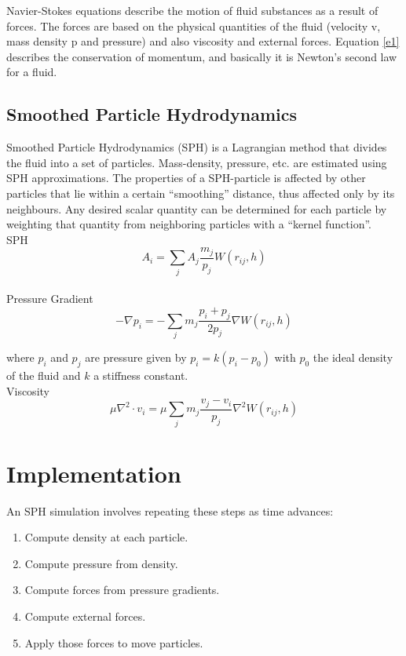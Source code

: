 \documentclass[a4paper,12pt,twoside]{report}
\begin{document}
\noindent Navier-Stokes equations describe the motion of fluid substances as a result of forces. The forces are based on the physical quantities of the fluid (velocity v, mass density p and pressure) and also viscosity and external forces. Equation \ref{e1} describes the conservation of momentum, and basically it is Newton’s second law for a fluid.\\

\section{Smoothed Particle Hydrodynamics}
Smoothed Particle Hydrodynamics (SPH) is a Lagrangian method that divides the fluid into a set of particles. Mass-density, pressure, etc. are estimated using SPH approximations. The properties of a SPH-particle is affected by other particles that lie within a certain “smoothing” distance, thus affected only by its neighbours. Any desired scalar quantity can be determined for each particle by weighting that quantity from neighboring particles with a “kernel function”. \\

\noindent SPH
\begin{equation}
{A_i} = {\sum_j A_j} \frac{m_j}{p_j} {W(r_{ij},h)}
\label{e2}
\end{equation}\\


\noindent Pressure Gradient
\begin{equation}
{-\nabla p_i} =  {-\sum_j}{m_j}\frac{p_i + p_j}{2p_j}{\nabla W(r_{ij},h)}
\label{e3}
\end{equation}

\noindent where $p_i$ and $p_j$ are pressure given by $p_i = k(p_i - p_0)$ with $p_0$ the ideal density of the fluid and $k$ a stiffness constant.\\

\noindent Viscosity
\begin{equation}
{\mu \nabla^2 \cdot v_i} = {\mu}{\sum_j}{m_j}\frac{v_j - v_i}{p_j}{\nabla^2 W(r_{ij},h)}
\label{e4}
\end{equation}



\chapter{Implementation}
An SPH simulation involves repeating these steps as time advances:
\begin{enumerate}
\item Compute density at each particle.
\item Compute pressure from density.
\item Compute forces from pressure gradients.
\item Compute external forces.
\item Apply those forces to move particles.
\end{enumerate}
\end{document}
